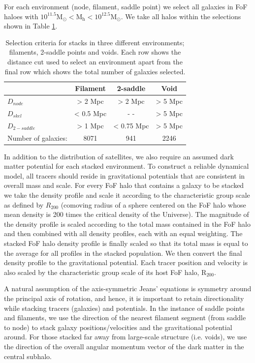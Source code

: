 For each environment (node, filament, saddle point) we select all galaxies in FoF haloes with $\mathrm{10^{11.5} M_{\odot} < M_{h} < 10^{12.5} M_{\odot}}$. We take all halos within the selections shown in Table \ref{tab:stacking}. 

\begin{table}
\centering
\begin{tabular}{|l|c|c|c|}
\hline
& Filament & 2-saddle & Void \\ \hline
$D_{node}$ & > 2 Mpc & > 2 Mpc & > 5 Mpc \\
$D_{skel}$ & < 0.5 Mpc  & - - & > 5 Mpc \\
$D_{2-saddle}$ & > 1 Mpc & < 0.75 Mpc & > 5 Mpc \\
Number of galaxies: & 8071 & 941 & 2246 \\
\hline
\end{tabular}
\caption{Selection criteria for stacks in three different environments; filaments, 2-saddle points and voids. Each row shows the distance cut used to select an environment apart from the final row which shows the total number of galaxies selected.}
\label{tab:stacking}
\end{table}

In addition to the distribution of satellites, we also require an assumed dark matter potential for each stacked environment. To construct a reliable dynamical model, all tracers should reside in gravitational potentials that are consistent in overall mass and scale. For every FoF halo that contains a galaxy to be stacked we take the density profile and scale it according to the characteristic group scale as defined by $R_{200}$ (comoving radius of a sphere centered on the FoF halo whose mean density is 200 times the critical density of the Universe). The magnitude of the density profile is scaled according to the total mass contained in the FoF halo and then combined with all density profiles, each with an equal weighting. The stacked FoF halo density profile is finally scaled so that its total mass is equal to the average for all profiles in the stacked population. We then convert the final density profile to the gravitational potential. Each tracer position and velocity is also scaled by the characteristic group scale of its host FoF halo, $\mathrm{R_{200}}$. 

A natural assumption of the axis-symmetric Jeans' equations is symmetry around the principal axis of rotation, and hence, it is important to retain directionality while stacking tracers (galaxies) and potentials. In the instance of saddle points and filaments, we use the direction of the nearest filament segment (from saddle to node) to stack galaxy positions/velocities and the gravitational potential around. For those stacked far away from large-scale structure (i.e. voids), we use the direction of the overall angular momentum vector of the dark matter in the central subhalo.

